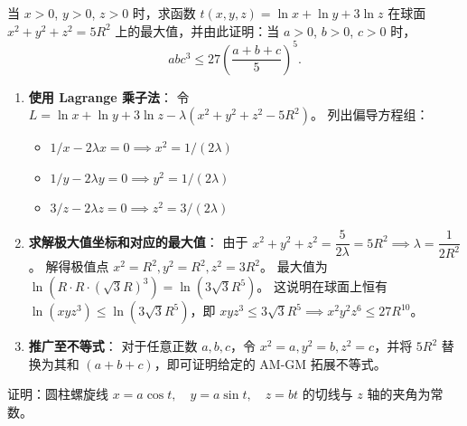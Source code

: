 \documentclass[lang=cn,11pt]{elegantbook}
\begin{document}

\begin{exercise}[对数函数在球面上的极值与 AM--GM 推广]
当 $x>0$, $y>0$, $z>0$ 时，求函数 $t(x,y,z)=\ln x+\ln y+3\ln z$ 在球面 $x^2+y^2+z^2=5R^2$ 上的最大值，并由此证明：当 $a>0$, $b>0$, $c>0$ 时，
\[
abc^3\leq 27\left(\frac{a+b+c}{5}\right)^{\!5}.
\]
\end{exercise}

\begin{solution}
\begin{enumerate}
  \item \textbf{使用 Lagrange 乘子法}：
  令 $L = \ln x + \ln y + 3\ln z - \lambda(x^2+y^2+z^2-5R^2)$。
  列出偏导方程组：
  \begin{itemize}
    \item $1/x - 2\lambda x = 0 \implies x^2 = 1/(2\lambda)$
    \item $1/y - 2\lambda y = 0 \implies y^2 = 1/(2\lambda)$
    \item $3/z - 2\lambda z = 0 \implies z^2 = 3/(2\lambda)$
  \end{itemize}
  \item \textbf{求解极大值坐标和对应的最大值}：
  由于 $x^2+y^2+z^2 = \dfrac{5}{2\lambda} = 5R^2 \implies \lambda = \dfrac{1}{2R^2}$。
  解得极值点 $x^2=R^2, y^2=R^2, z^2=3R^2$。
  最大值为 $\ln(R \cdot R \cdot (\sqrt{3}R)^3) = \ln(3\sqrt{3}R^5)$。
  这说明在球面上恒有 $\ln(xyz^3) \leq \ln(3\sqrt{3}R^5)$，即 $x y z^3 \leq 3\sqrt{3}R^5 \implies x^2 y^2 z^6 \leq 27R^{10}$。
  \item \textbf{推广至不等式}：
  对于任意正数 $a, b, c$，令 $x^2=a, y^2=b, z^2=c$，并将 $5R^2$ 替换为其和 $(a+b+c)$，即可证明给定的 AM-GM 拓展不等式。
\end{enumerate}
\end{solution}



\begin{exercise}[圆柱螺旋线的切线几何性质]
证明：圆柱螺旋线 $x=a\cos t,\quad y=a\sin t,\quad z=bt$ 的切线与 $z$ 轴的夹角为常数。
\end{exercise}
\end{document}
